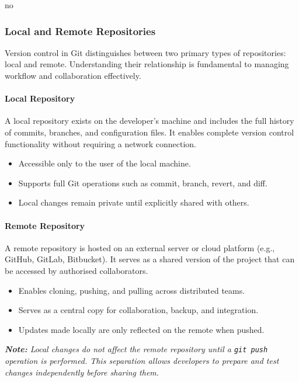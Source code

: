 no\documentclass{article}
\newcommand{\codecmd}[1]{\textcolor[rgb]{0,0.5,0}{\texttt{#1}}}
\begin{document}
\subsubsection{Local and Remote Repositories}

Version control in Git distinguishes between two primary types of repositories: local and remote. Understanding their relationship is fundamental to managing workflow and collaboration effectively.

\paragraph*{Local Repository}
A local repository exists on the developer's machine and includes the full history of commits, branches, and configuration files. It enables complete version control functionality without requiring a network connection.

\begin{itemize}
    \item Accessible only to the user of the local machine.
    \item Supports full Git operations such as commit, branch, revert, and diff.
    \item Local changes remain private until explicitly shared with others.
\end{itemize}

\paragraph*{Remote Repository}
A remote repository is hosted on an external server or cloud platform (e.g., GitHub, GitLab, Bitbucket). It serves as a shared version of the project that can be accessed by authorised collaborators.

\begin{itemize}
    \item Enables cloning, pushing, and pulling across distributed teams.
    \item Serves as a central copy for collaboration, backup, and integration.
    \item Updates made locally are only reflected on the remote when pushed.
\end{itemize}

\noindent\textit{\textbf{Note:} Local changes do not affect the remote repository until a \codecmd{git push} operation is performed. This separation allows developers to prepare and test changes independently before sharing them.}
\end{document}
